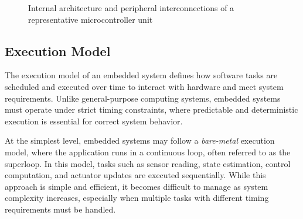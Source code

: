 \begin{figure}[H]
    \caption{Internal architecture and peripheral interconnections of a representative microcontroller unit}
    \label{fig:embedded_arch}
\end{figure}

\subsection{Execution Model}

The execution model of an embedded system defines how software tasks are scheduled and executed over time to interact with hardware and meet system requirements. Unlike general-purpose computing systems, embedded systems must operate under strict timing constraints, where predictable and deterministic execution is essential for correct system behavior.

At the simplest level, embedded systems may follow a \textit{bare-metal} execution model, where the application runs in a continuous loop, often referred to as the superloop. In this model, tasks such as sensor reading, state estimation, control computation, and actuator updates are executed sequentially. While this approach is simple and efficient, it becomes difficult to manage as system complexity increases, especially when multiple tasks with different timing requirements must be handled.

